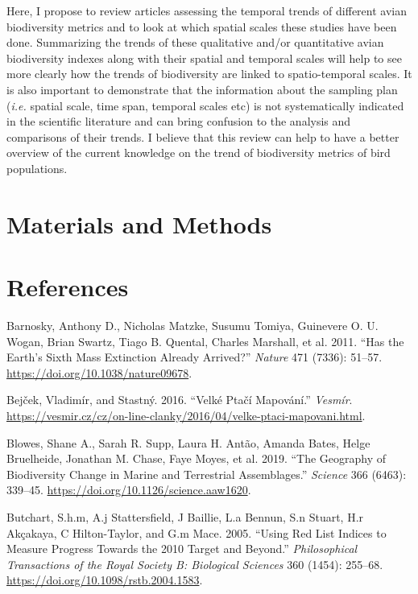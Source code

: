 \documentclass[
  12pt,
  oneside]{report}
\begin{document}
Here, I propose to review articles assessing the temporal trends of different avian biodiversity metrics and to look at which spatial scales these studies have been done. Summarizing the trends of these qualitative and/or quantitative avian biodiversity indexes along with their spatial and temporal scales will help to see more clearly how the trends of biodiversity are linked to spatio-temporal scales. It is also important to demonstrate that the information about the sampling plan (\emph{i.e.} spatial scale, time span, temporal scales etc) is not systematically indicated in the scientific literature and can bring confusion to the analysis and comparisons of their trends. I believe that this review can help to have a better overview of the current knowledge on the trend of biodiversity metrics of bird populations.

\hypertarget{materials-and-methods}{%
\chapter{Materials and Methods}\label{materials-and-methods}}

\hypertarget{references}{%
\chapter*{References}\label{references}}

\singlespacing

\hypertarget{refs}{}
\leavevmode\hypertarget{ref-barnosky_has_2011}{}%
Barnosky, Anthony D., Nicholas Matzke, Susumu Tomiya, Guinevere O. U. Wogan, Brian Swartz, Tiago B. Quental, Charles Marshall, et al. 2011. ``Has the Earth's Sixth Mass Extinction Already Arrived?'' \emph{Nature} 471 (7336): 51--57. \url{https://doi.org/10.1038/nature09678}.

\leavevmode\hypertarget{ref-bejcek_velke_2016}{}%
Bejček, Vladimír, and Stastný. 2016. ``Velké Ptačí Mapování.'' \emph{Vesmír}. \url{https://vesmir.cz/cz/on-line-clanky/2016/04/velke-ptaci-mapovani.html}.

\leavevmode\hypertarget{ref-blowes_geography_2019}{}%
Blowes, Shane A., Sarah R. Supp, Laura H. Antão, Amanda Bates, Helge Bruelheide, Jonathan M. Chase, Faye Moyes, et al. 2019. ``The Geography of Biodiversity Change in Marine and Terrestrial Assemblages.'' \emph{Science} 366 (6463): 339--45. \url{https://doi.org/10.1126/science.aaw1620}.

\leavevmode\hypertarget{ref-butchart_using_2005}{}%
Butchart, S.h.m, A.j Stattersfield, J Baillie, L.a Bennun, S.n Stuart, H.r Akçakaya, C Hilton-Taylor, and G.m Mace. 2005. ``Using Red List Indices to Measure Progress Towards the 2010 Target and Beyond.'' \emph{Philosophical Transactions of the Royal Society B: Biological Sciences} 360 (1454): 255--68. \url{https://doi.org/10.1098/rstb.2004.1583}.
\end{document}
